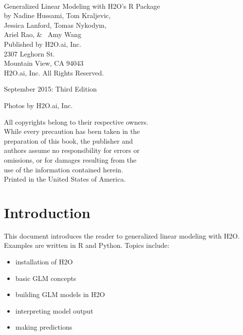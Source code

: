 \thispagestyle{empty}%


{\raggedright\vfill\ 

Generalized Linear Modeling with H2O's R Package\\

by Nadine Hussami, Tom Kraljevic, \\ Jessica Lanford, Tomas Nykodym, \\ Ariel Rao,  \& \ Amy Wang \\
\bigskip
  Published by H2O.ai, Inc. \\
2307 Leghorn St. \\
Mountain View, CA 94043\\
\bigskip
{} H2O.ai, Inc. All Rights Reserved. 
\bigskip

September 2015: Third Edition
\bigskip

Photos by \textcopyright H2O.ai, Inc.
\bigskip

All copyrights belong to their respective owners.\\
While every precaution has been taken in the\\
preparation of this book, the publisher and\\
authors assume no responsibility for errors or\\
omissions, or for damages resulting from the\\
use of the information contained herein.\\
\bigskip
Printed in the United States of America. 
}

\newpage
\thispagestyle{empty}%
\tableofcontents
\thispagestyle{empty}%



\newpage

\section{Introduction}
This document introduces the reader to generalized linear modeling with H2O.  Examples are written in R and Python.
Topics include: 
\begin{itemize}
\item installation of H2O
\item basic GLM concepts
\item building GLM models in H2O
\item interpreting model output
\item making predictions
\end{itemize}

